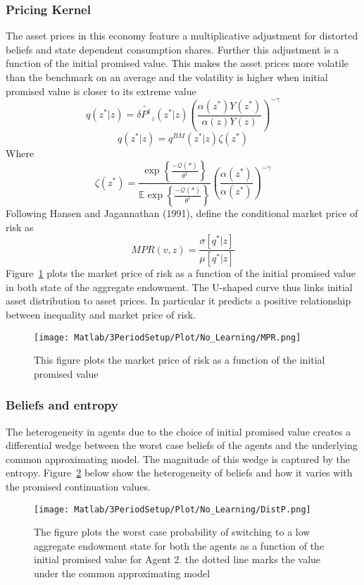 \documentclass[12pt]{article}
\begin{document}
\subsubsection{Pricing Kernel}
\noindent The asset prices in this economy feature a multiplicative adjustment for distorted beliefs and state dependent consumption shares. Further this adjustment is a function of the initial promised value. This makes the asset prices more volatile than the benchmark on an average and the volatility is higher when initial promised value is closer to its extreme value
\[q(z^* | z)=\delta \tilde{P^1}_z(z^* |z)\left(\frac{\alpha(z^*)Y(z^*)}{\alpha(z)Y(z)}\right)^{-\gamma}\]
\[q(z^* | z)=q^{BM}(z^* | z)\zeta(z^*)\]
Where 
\[\zeta(z^*) = \frac{\exp\left\{\frac{-\mathcal{Q}(*)}{\theta^1}\right\}}{\mathbb{E}\exp\left\{\frac{-\mathcal{Q}(*)}{\theta^1}\right\}}\left(\frac{\alpha(z^*)}{\alpha(z^*)}\right)^{-\gamma} \]
Following Hansen and Jagannathan (1991), define the conditional market price of risk as 
\[MPR(v,z)=\frac{\sigma[q^*|z]}{\mu[q^*|z]}\]
Figure~\ref{fig:MPR} plots the market price of risk as a function of the initial promised value in both state of the aggregate endowment. The U-shaped curve thus links initial asset distribution to asset prices. In particular it predicts a positive relationship between inequality and market price of risk.
\begin{figure}[htbp]
\centering
	  \texttt{[image: Matlab/3PeriodSetup/Plot/No\_Learning/MPR.png]}

	\caption{This figure plots the market price of risk as a function of the initial promised value}
	\label{fig:MPR}
\end{figure} 

\subsubsection{Beliefs and entropy}
The heterogeneity in agents due to the choice of initial promised value creates a differential wedge between the worst case beliefs of the agents and the underlying common approximating model. The magnitude of this wedge is captured by the entropy. Figure~\ref{fig:DistP} below show the heterogeneity of beliefs and how it varies with the promised continuation values.
\begin{figure}[htbp]
\centering
	  \texttt{[image: Matlab/3PeriodSetup/Plot/No\_Learning/DistP.png]}

	\caption{The figure plots the worst case probability of switching to a low aggregate endowment state for both the agents as a function of the initial promised value for Agent 2. the dotted line marks the value under the common approximating model }
	\label{fig:DistP}
\end{figure} 
\end{document}
